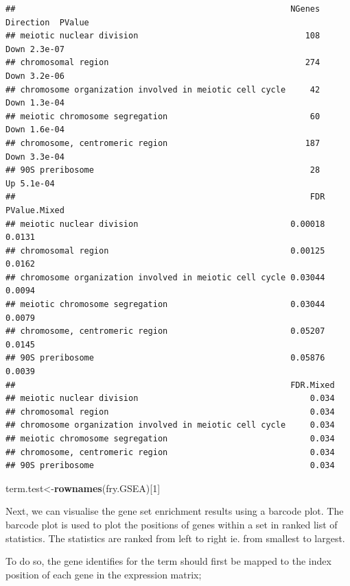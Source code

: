 \documentclass[]{book}
\newenvironment{Shaded}{\begin{snugshade}}{\end{snugshade}}
\newcommand{\DecValTok}[1]{\textcolor[rgb]{0.00,0.00,0.81}{#1}}
\newcommand{\KeywordTok}[1]{\textcolor[rgb]{0.13,0.29,0.53}{\textbf{#1}}}
\newcommand{\NormalTok}[1]{#1}
\begin{document}
\begin{verbatim}
##                                                        NGenes Direction  PValue
## meiotic nuclear division                                  108      Down 2.3e-07
## chromosomal region                                        274      Down 3.2e-06
## chromosome organization involved in meiotic cell cycle     42      Down 1.3e-04
## meiotic chromosome segregation                             60      Down 1.6e-04
## chromosome, centromeric region                            187      Down 3.3e-04
## 90S preribosome                                            28        Up 5.1e-04
##                                                            FDR PValue.Mixed
## meiotic nuclear division                               0.00018       0.0131
## chromosomal region                                     0.00125       0.0162
## chromosome organization involved in meiotic cell cycle 0.03044       0.0094
## meiotic chromosome segregation                         0.03044       0.0079
## chromosome, centromeric region                         0.05207       0.0145
## 90S preribosome                                        0.05876       0.0039
##                                                        FDR.Mixed
## meiotic nuclear division                                   0.034
## chromosomal region                                         0.034
## chromosome organization involved in meiotic cell cycle     0.034
## meiotic chromosome segregation                             0.034
## chromosome, centromeric region                             0.034
## 90S preribosome                                            0.034
\end{verbatim}

\begin{Shaded}
\begin{Highlighting}[]
\NormalTok{term.test<-}\KeywordTok{rownames}\NormalTok{(fry.GSEA)[}\DecValTok{1}\NormalTok{]}
\end{Highlighting}
\end{Shaded}

Next, we can visualise the gene set enrichment results using a barcode plot. The barcode plot is used to plot the positions of genes within a set in ranked list of statistics. The statistics are ranked from left to right ie. from smallest to largest.

To do so, the gene identifies for the term should first be mapped to the index position of each gene in the expression matrix;
\end{document}
